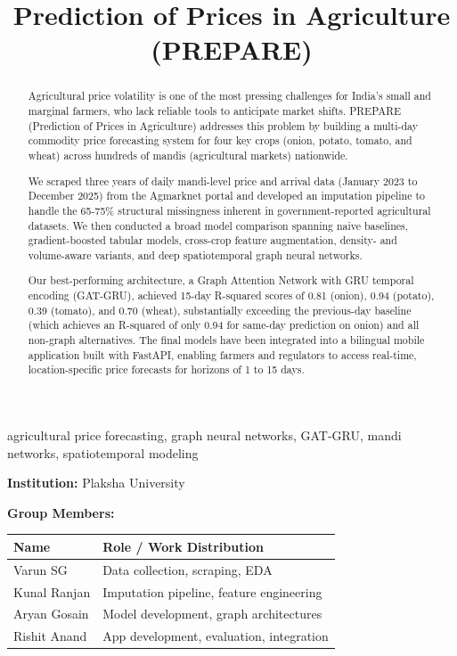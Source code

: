 \documentclass[conference]{IEEEtran}
\title{Prediction of Prices in Agriculture (PREPARE)}
\author{
\IEEEauthorblockN{Varun SG, Kunal Ranjan, Aryan Gosain, Rishit Anand}
\IEEEauthorblockA{Plaksha University\\
Faculty Guide: Prof. Mayank Ratan Bhardwaj\\
9 May 2026}
}
\begin{document}
\maketitle

\begin{abstract}

Agricultural price volatility is one of the most pressing challenges for India's small and marginal farmers, who lack reliable tools to anticipate market shifts. PREPARE (Prediction of Prices in Agriculture) addresses this problem by building a multi-day commodity price forecasting system for four key crops (onion, potato, tomato, and wheat) across hundreds of mandis (agricultural markets) nationwide.

We scraped three years of daily mandi-level price and arrival data (January 2023 to December 2025) from the Agmarknet portal and developed an imputation pipeline to handle the 65-75\% structural missingness inherent in government-reported agricultural datasets. We then conducted a broad model comparison spanning naive baselines, gradient-boosted tabular models, cross-crop feature augmentation, density- and volume-aware variants, and deep spatiotemporal graph neural networks.

Our best-performing architecture, a Graph Attention Network with GRU temporal encoding (GAT-GRU), achieved 15-day R-squared scores of 0.81 (onion), 0.94 (potato), 0.39 (tomato), and 0.70 (wheat), substantially exceeding the previous-day baseline (which achieves an R-squared of only 0.94 for same-day prediction on onion) and all non-graph alternatives. The final models have been integrated into a bilingual mobile application built with FastAPI, enabling farmers and regulators to access real-time, location-specific price forecasts for horizons of 1 to 15 days.

\end{abstract}

\begin{IEEEkeywords}
agricultural price forecasting, graph neural networks, GAT-GRU, mandi networks, spatiotemporal modeling
\end{IEEEkeywords}

\textbf{Institution:} Plaksha University

\textbf{Group Members:}

\begin{table}[H]
\centering
\begin{tabularx}{\textwidth}{|>{\raggedright\arraybackslash}X|>{\raggedright\arraybackslash}X|}
\hline
Name & Role / Work Distribution \\
\hline
Varun SG & Data collection, scraping, EDA \\
\hline
Kunal Ranjan & Imputation pipeline, feature engineering \\
\hline
Aryan Gosain & Model development, graph architectures \\
\hline
Rishit Anand & App development, evaluation, integration \\
\hline
\end{tabularx}
\end{table}
\end{document}

